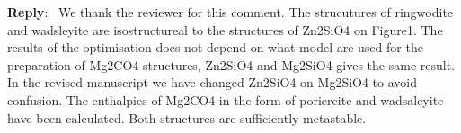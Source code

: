 \documentclass[a4paper]{article}
\newcounter{reviewer}
\newenvironment{reply}
   {\medskip \noindent \begin{sf}\textbf{Reply}:\  }
   {\medskip \end{sf}}
\begin{document}
\begin{reply}
We thank the reviewer for this comment. 
The strucutures of ringwodite and wadsleyite are isostructureal to the structures of Zn2SiO4 on Figure1. 
The results of the optimisation does not depend on what model are used for the preparation of Mg2CO4 structures, Zn2SiO4 and Mg2SiO4 gives the same result. 
In the revised manuscript we have changed Zn2SiO4 on Mg2SiO4 to avoid confusion.
The enthalpies of Mg2CO4 in the form of poriereite and wadsaleyite have been calculated.
Both structures are sufficiently metastable.


\end{reply}
\end{document}
